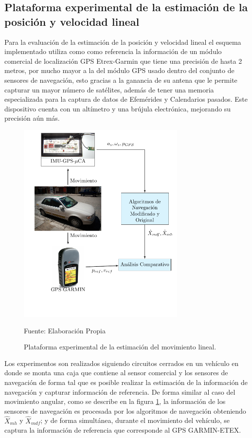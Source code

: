 \documentclass[conference]{IEEEtran}
\begin{document}
\subsection{Plataforma experimental de la estimación de la posición y velocidad lineal}
Para la evaluación de la estimación de la posición y velocidad lineal el esquema implementado utiliza como como referencia la información de un módulo comercial de localización GPS Etrex-Garmin que tiene una precisión de hasta 2 metros, por mucho mayor a la del módulo GPS usado dentro del conjunto de sensores de navegación, esto gracias a la ganancia de su antena que le permite capturar un mayor número de satélites, además de tener una memoria especializada para la captura de datos de Efemérides y Calendarios pasados. Este dispositivo cuenta con un altímetro y una brújula electrónica, mejorando su precisión aún más.\par%
\begin{figure}
\centering
\includegraphics[width=22.5em]{plataforma_fig14.pdf}
\caption{Plataforma experimental de la estimación del movimiento lineal.}
\scriptsize{Fuente: Elaboración Propia}
\label{plataforma_fig9}
\end{figure}
Los experimentos son realizados siguiendo circuitos cerrados en un vehículo en donde se monta una caja que contiene al sensor comercial y los sensores de navegación de forma tal que es posible realizar la estimación de la información de navegación y capturar información de referencia. De forma similar al caso del movimiento angular, como se describe en la figura \ref{plataforma_fig9}, la información de los sensores de navegación es procesada por los algoritmos de navegación obteniendo $\hat{X}_{mh}$ y $\hat{X}_{mdf}$; y de forma simultánea, durante el movimiento del vehículo, se captura la información de referencia que corresponde al GPS GARMIN-ETEX.
\end{document}
